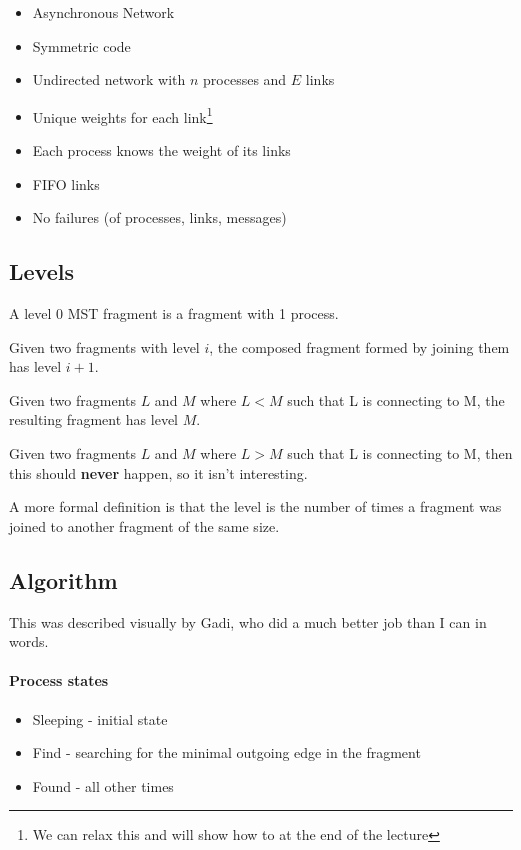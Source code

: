 \documentclass{idc_msc}
\begin{document}
\begin{itemize}
  \item Asynchronous Network
  \item Symmetric code
  \item Undirected network with $n$ processes and $E$ links
  \item Unique weights for each link\footnote{We can relax this and will show how to at the end of the lecture}
  \item Each process knows the weight of its links
  \item FIFO links
  \item No failures (of processes, links, messages)
\end{itemize}

\subsection{Levels}

A level 0 MST fragment is a fragment with 1 process.

Given two fragments with level $i$, the composed fragment formed by joining them has level $i+1$.

Given two fragments $L$ and $M$ where $L < M$ such that L is connecting to M, the resulting fragment has level $M$.

Given two fragments $L$ and $M$ where $L > M$ such that L is connecting to M, then this should \textbf{never} happen, so it isn't interesting.

A more formal definition is that the level is the number of times a fragment was joined to another fragment of the same size.

\subsection{Algorithm}

This was described visually by Gadi, who did a much better job than I can in words.


\paragraph{Process states}

\begin{itemize}
  \item Sleeping - initial state
  \item Find - searching for the minimal outgoing edge in the fragment
  \item Found - all other times
\end{itemize}
\end{document}
